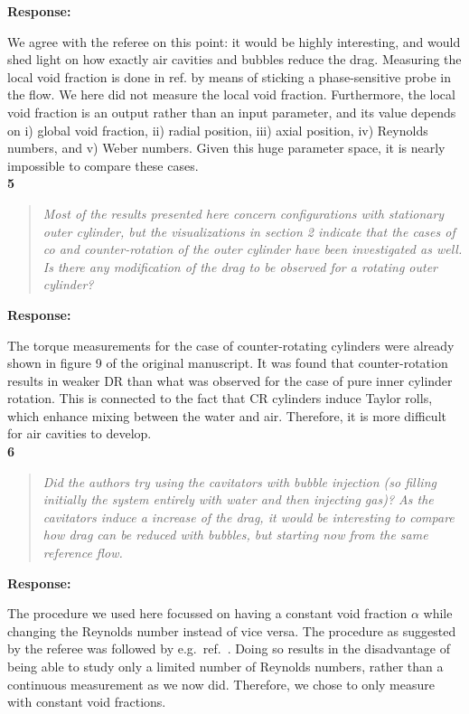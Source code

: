 \documentclass[10pt]{article}
\newcommand{\strong}[1]{\textbf{#1}}
\newcommand{\question}[1]{\begin{quote} \emph{#1}  \end{quote} }
\begin{document}
\noindent \strong{Response:} 

\noindent We agree with the referee on this point: it would be highly interesting, and would shed light on how exactly air cavities and bubbles reduce the drag. Measuring the local void fraction is done in ref. \cite{gil13} by means of sticking a phase-sensitive probe in the flow. We here did not measure the local void fraction. Furthermore,  the local void fraction is an output rather than an input parameter, and its value depends on i) global void fraction, ii) radial position, iii) axial position, iv) Reynolds numbers, and v) Weber numbers. Given this huge parameter space, it is nearly impossible to compare these cases. \\

\noindent \strong{5}

\question{Most of the results presented here concern configurations with stationary outer cylinder, but the visualizations in section 2 indicate that the cases of co and counter-rotation of the outer cylinder have been investigated as well. Is there any modification of the drag to be observed for a rotating outer cylinder? }

\noindent \strong{Response:} 

\noindent The torque measurements for the case of counter-rotating cylinders were already shown in figure 9 of the original manuscript. It was found that counter-rotation results in weaker DR than what was observed for the case of pure inner cylinder rotation. This is connected to the fact that CR cylinders induce Taylor rolls, which enhance mixing between the water and air. Therefore, it is more difficult for air cavities to develop.\\

\noindent \strong{6}

\question{Did the authors try using the cavitators with bubble injection (so filling initially the system entirely with water and then injecting gas)? As the cavitators induce a increase of the drag, it would be interesting to compare how drag can be reduced with bubbles, but starting now from the same reference flow. }

\noindent \strong{Response:} 

\noindent  The procedure we used here focussed on having a constant void fraction $\alpha$ while changing the Reynolds number instead of vice versa. The procedure as suggested by the referee was followed by e.g.\ ref.\ \cite{gil13}. Doing so results in  the disadvantage of being able to study only a limited number of Reynolds numbers, rather than a continuous measurement as we now did. Therefore, we chose to only measure with constant void fractions. \\
\end{document}
